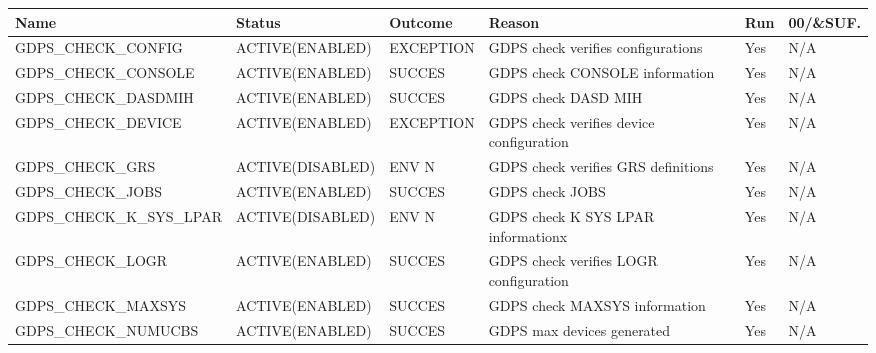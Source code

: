 \begin{landscape}
	\begin{table}[h]
		\begin{tabular}{|l|l|l|p{4.5cm}|l|l|}
			\hline
			\textbf{Name}             & \textbf{Status}  & \textbf{Outcome} & \textbf{Reason}                                 & \textbf{Run} & \textbf{00/\&SUF.} \\ \hline
			GDPS\_CHECK\_CONFIG       & ACTIVE(ENABLED)  & EXCEPTION        & GDPS check verifies configurations              & Yes          & N/A                \\ \hline
			GDPS\_CHECK\_CONSOLE      & ACTIVE(ENABLED)  & SUCCES           & GDPS   check CONSOLE information                & Yes          & N/A                \\ \hline
			GDPS\_CHECK\_DASDMIH      & ACTIVE(ENABLED)  & SUCCES           & GDPS   check DASD MIH                           & Yes          & N/A                \\ \hline
			GDPS\_CHECK\_DEVICE       & ACTIVE(ENABLED)  & EXCEPTION        & GDPS   check verifies device configuration      & Yes          & N/A                \\ \hline
			GDPS\_CHECK\_GRS          & ACTIVE(DISABLED) & ENV N            & GDPS check verifies GRS definitions             & Yes          & N/A                \\ \hline
			GDPS\_CHECK\_JOBS         & ACTIVE(ENABLED)  & SUCCES           & GDPS   check JOBS                               & Yes          & N/A                \\ \hline
			GDPS\_CHECK\_K\_SYS\_LPAR & ACTIVE(DISABLED) & ENV N            & GDPS check K SYS LPAR informationx              & Yes          & N/A                \\ \hline
			GDPS\_CHECK\_LOGR         & ACTIVE(ENABLED)  & SUCCES           & GDPS   check verifies LOGR configuration        & Yes          & N/A                \\ \hline
			GDPS\_CHECK\_MAXSYS       & ACTIVE(ENABLED)  & SUCCES           & GDPS   check MAXSYS information                 & Yes          & N/A                \\ \hline
			GDPS\_CHECK\_NUMUCBS      & ACTIVE(ENABLED)  & SUCCES           & GDPS   max devices generated                    & Yes          & N/A                \\ \hline
		\end{tabular}
	\end{table}
\end{landscape}

